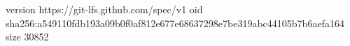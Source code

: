 version https://git-lfs.github.com/spec/v1
oid sha256:a549110fdb193a09b0f0af812e677e68637298e7be319abc44105b7b6aefa164
size 30852
